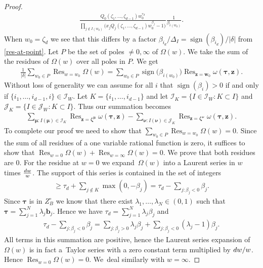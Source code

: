 \documentclass[11pt]{article}
\numberwithin{equation}{section}
\DeclareMathOperator*{\Res}{Res}
\DeclareMathOperator*{\sign}{sign}
\numberwithin{equation}{section}
\begin{document}
\begin{proof}
\begin{gather*}
\frac{Q_0(\zeta_1,\dots,\zeta_{d-1})w_0^{\tau_d}}{\prod_{j\not\in I(w_0)}
\big(x_jQ_j(\zeta_1,\dots,\zeta_{d-1})w_0^{\beta_j}-1\big)}\frac{1}{\beta_{i(w_0)}}.
\end{gather*}
When $w_0=\zeta_d$ we see that this differs by a factor
$\beta_{i_d}/\Delta_I=\sign(\beta_{i_d})/|\delta|$ from \eqref{res-at-point}.
Let $P$ be the set of poles $\ne0,\infty$ of $\Omega(w)$. We take the sum of the residues
of $\Omega(w)$ over all poles in $P$. We get
\begin{gather*}
\frac{1}{|\delta|}\sum_{w_0\in P}\Res_{w=w_0}\Omega(w)=\sum_{w_0\in P}\sign\big(\beta_{i(w_0)}\big)\Res_{\bm{z}=\bm{w}_0}
\omega(\bm{\tau},\bm{z}).
\end{gather*}
Without loss of generality we can assume for all $i$ that $\sign(\beta_i)>0$ if
and only if $\{i_1,\dots,i_{d-1},i\}\allowbreak\in\mathcal{I}_W$. Let $K=\{i_1,\dots,i_{d-1}\}$ and let $\mathcal{I}_K = \{I \in \mathcal{I}_W\colon K \subset I\}$ and $\mathcal{J}_K = \{I \in \mathcal{J}_W\colon K \subset I\}$.
Thus our summation becomes
\begin{gather*}
\sum_{\bm\mu\colon I(\bm\mu)\in\mathcal{I}_K}\Res_{\bm{z}=\bm{\zeta}^{\bm\mu}}\omega(\bm{\tau},\bm{z})
-\sum_{\bm{\nu}\colon I(\bm\nu)\in\mathcal{J}_K}\Res_{\bm{z}=\bm{\zeta}^{\bm\nu}}\omega(\bm{\tau},\bm{z}).
\end{gather*}
To complete our proof we need to show that $\sum_{w_0\in P}\Res_{w=w_0}\Omega(w)=0$.
Since the sum of all residues of a one variable rational function is zero, it suffices
to show that $\Res_{w=0}\Omega(w)+\Res_{w=\infty}\Omega(w)=0$. We prove that both
residues are $0$. For the residue at $w=0$ we expand~$\Omega(w)$ into a Laurent series in
$w$ times $\frac{{\rm d}w}{w}$. The support of this series is contained in the set of integers
\begin{gather*}
\ge \tau_d+\sum_{j\not\in K}\max(0,-\beta_j)=\tau_d-\sum_{j\colon \beta_j<0}\beta_j.
\end{gather*}
Since $\bm\tau$ is in $Z_B^{\circ}$ we know that there exist $\lambda_1,
\dots,\lambda_N\in(0,1)$ such that $\bm\tau=\sum_{j=1}^N\lambda_j\bm{b}_j$.
Hence we have $\tau_d=\sum_{j=1}^N\lambda_j\beta_j$ and
\begin{gather*}
\tau_d-\sum_{j\colon \beta_j<0}\beta_j =\sum_{j\colon \beta_j>0}\lambda_j\beta_j+
\sum_{j\colon \beta_j<0}(\lambda_j-1)\beta_j.
\end{gather*}
All terms in this summation are positive, hence the Laurent series expansion
of $\Omega(w)$ is in fact a~Taylor series with a zero constant term multiplied by ${\rm d}w/w$.
Hence $\Res_{w=0}\Omega(w)=0$. We~deal similarly with $w=\infty$.
\end{proof}
\end{document}
